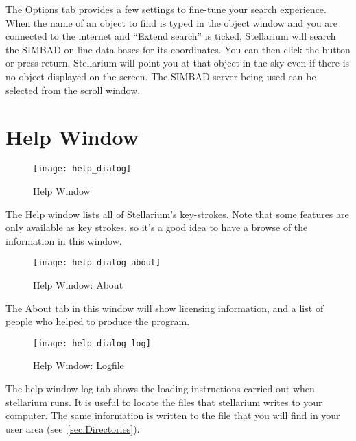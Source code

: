 The Options tab provides a few settings to fine-tune your search experience.
When the name of an object to find is typed in the object
window and you are connected to the internet and ``Extend search'' is
ticked, Stellarium will search the SIMBAD on-line  data bases for its
coordinates. You can then click the  button or press return.
Stellarium will point you at that object in the sky even if there is no
object displayed on the screen. The SIMBAD server being used can be
selected from the scroll window.


\section{Help Window}

\begin{figure}[h]
\centering\texttt{[image: help\_dialog]}
\caption{Help Window}
\label{fig:gui:help}
\end{figure}

The Help window lists all of Stellarium's key-strokes. Note that some
features are only available as key strokes, so it's a good idea to have
a browse of the information in this window.

\begin{figure}[h]
\centering\texttt{[image: help\_dialog\_about]}
\caption{Help Window: About}
\label{fig:gui:help:about}
\end{figure}

The About tab in this window will show licensing information, and a list
of people who helped to produce the program.

\begin{figure}[h]
\centering\texttt{[image: help\_dialog\_log]}
\caption{Help Window: Logfile}
\label{fig:gui:help:log}
\end{figure}

The help window log tab shows the loading instructions carried out when
stellarium runs. It is useful to locate the files that stellarium writes
to your computer. The same information is written to  the file  that you will
find in your user area (see~\ref{sec:Directories}).




